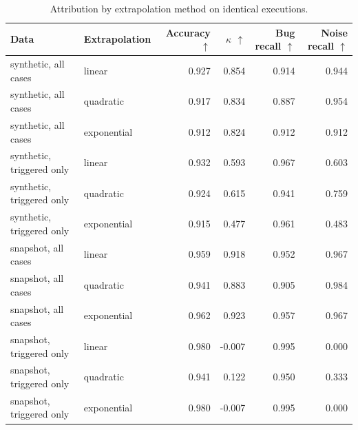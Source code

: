 \begin{table}[t]
\centering
\caption{Attribution by extrapolation method on identical executions.}
\label{tab:rq3-extrapolation}
\small
\begin{tabular}{llrrrr}
\toprule
Data & Extrapolation & Accuracy $\uparrow$ & $\kappa$ $\uparrow$ & Bug recall $\uparrow$ & Noise recall $\uparrow$ \\
\midrule
synthetic, all cases & linear & 0.927 & 0.854 & 0.914 & 0.944 \\
synthetic, all cases & quadratic & 0.917 & 0.834 & 0.887 & 0.954 \\
synthetic, all cases & exponential & 0.912 & 0.824 & 0.912 & 0.912 \\
synthetic, triggered only & linear & 0.932 & 0.593 & 0.967 & 0.603 \\
synthetic, triggered only & quadratic & 0.924 & 0.615 & 0.941 & 0.759 \\
synthetic, triggered only & exponential & 0.915 & 0.477 & 0.961 & 0.483 \\
snapshot, all cases & linear & 0.959 & 0.918 & 0.952 & 0.967 \\
snapshot, all cases & quadratic & 0.941 & 0.883 & 0.905 & 0.984 \\
snapshot, all cases & exponential & 0.962 & 0.923 & 0.957 & 0.967 \\
snapshot, triggered only & linear & 0.980 & -0.007 & 0.995 & 0.000 \\
snapshot, triggered only & quadratic & 0.941 & 0.122 & 0.950 & 0.333 \\
snapshot, triggered only & exponential & 0.980 & -0.007 & 0.995 & 0.000 \\
\bottomrule
\end{tabular}
\end{table}
